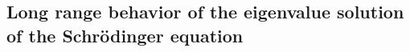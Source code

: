 \documentclass[reprint,aps,prb]{revtex4-1}
\begin{document}
% 


\subsection{Long range behavior of the eigenvalue solution of the Schr\"odinger equation}
\label{SEopenSystem}
\end{document}
